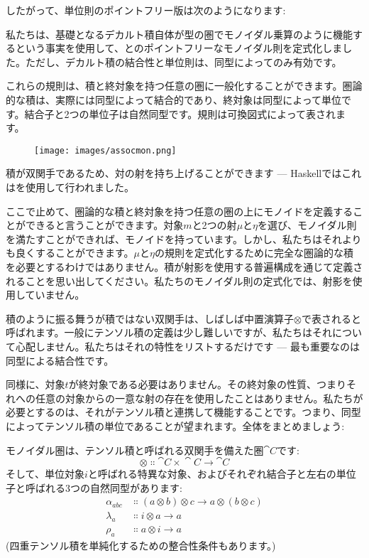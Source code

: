 
したがって、単位則のポイントフリー版は次のようになります: 

私たちは、基礎となるデカルト積自体が型の圏でモノイダル乗算のように機能するという事実を使用して、とのポイントフリーなモノイダル則を定式化しました。ただし、デカルト積の結合性と単位則は、同型によってのみ有効です。

これらの規則は、積と終対象を持つ任意の圏に一般化することができます。圏論的な積は、実際には同型によって結合的であり、終対象は同型によって単位です。結合子と2つの単位子は自然同型です。規則は可換図式によって表されます。

\begin{figure}[H]
  \centering
  \texttt{[image: images/assocmon.png]}
\end{figure}

\noindent
積が双関手であるため、対の射を持ち上げることができます --- Haskellではこれはを使用して行われました。

ここで止めて、圏論的な積と終対象を持つ任意の圏の上にモノイドを定義することができると言うことができます。対象$m$と2つの射$\mu$と$\eta$を選び、モノイダル則を満たすことができれば、モノイドを持っています。しかし、私たちはそれよりも良くすることができます。$\mu$と$\eta$の規則を定式化するために完全な圏論的な積を必要とするわけではありません。積が射影を使用する普遍構成を通じて定義されることを思い出してください。私たちのモノイダル則の定式化では、射影を使用していません。

積のように振る舞うが積ではない双関手は、しばしば中置演算子$\otimes$で表されると呼ばれます。一般にテンソル積の定義は少し難しいですが、私たちはそれについて心配しません。私たちはそれの特性をリストするだけです --- 最も重要なのは同型による結合性です。

同様に、対象$t$が終対象である必要はありません。その終対象の性質、つまりそれへの任意の対象からの一意な射の存在を使用したことはありません。私たちが必要とするのは、それがテンソル積と連携して機能することです。つまり、同型によってテンソル積の単位であることが望まれます。全体をまとめましょう: 

モノイダル圏は、テンソル積と呼ばれる双関手を備えた圏$\cat{C}$です: 
\[\otimes \Colon \cat{C}\times{}\cat{C} \to \cat{C}\]
そして、単位対象$i$と呼ばれる特異な対象、およびそれぞれ結合子と左右の単位子と呼ばれる3つの自然同型があります: 
\begin{align*}
  \alpha_{a b c} & \Colon (a \otimes b) \otimes c \to a \otimes (b \otimes c) \\
  \lambda_a      & \Colon i \otimes a \to a                                   \\
  \rho_a         & \Colon a \otimes i \to a
\end{align*}
 (四重テンソル積を単純化するための整合性条件もあります。) 

